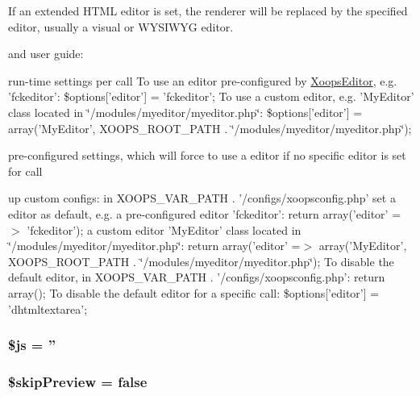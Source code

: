 If an extended H\-T\-M\-L editor is set, the renderer will be replaced by the specified editor, usually a visual or W\-Y\-S\-I\-W\-Y\-G editor.


\begin{DoxyItemize}
\item 
\end{DoxyItemize}and user guide\-:  
\begin{DoxyItemize}
\item 
\end{DoxyItemize}run-\/time settings per call To use an editor pre-\/configured by \hyperlink{}{Xoops\-Editor}, e.\-g. 'fckeditor'\-: {\ttfamily \$options\mbox{[}'editor'\mbox{]} = 'fckeditor';} To use a custom editor, e.\-g. 'My\-Editor' class located in \char`\"{}/modules/myeditor/myeditor.\-php\char`\"{}\-: {\ttfamily \$options\mbox{[}'editor'\mbox{]} = array('My\-Editor', X\-O\-O\-P\-S\-\_\-\-R\-O\-O\-T\-\_\-\-P\-A\-T\-H . \char`\"{}/modules/myeditor/myeditor.\-php\char`\"{});}    
\begin{DoxyItemize}
\item 
\end{DoxyItemize}pre-\/configured settings, which will force to use a editor if no specific editor is set for call  
\begin{DoxyItemize}
\item 
\end{DoxyItemize}up custom configs\-: in X\-O\-O\-P\-S\-\_\-\-V\-A\-R\-\_\-\-P\-A\-T\-H . '/configs/xoopsconfig.php' set a editor as default, e.\-g. a pre-\/configured editor 'fckeditor'\-: {\ttfamily return array('editor' =$>$ 'fckeditor');} a custom editor 'My\-Editor' class located in \char`\"{}/modules/myeditor/myeditor.\-php\char`\"{}\-: {\ttfamily return array('editor' =$>$ array('My\-Editor', X\-O\-O\-P\-S\-\_\-\-R\-O\-O\-T\-\_\-\-P\-A\-T\-H . \char`\"{}/modules/myeditor/myeditor.\-php\char`\"{});}   To disable the default editor, in X\-O\-O\-P\-S\-\_\-\-V\-A\-R\-\_\-\-P\-A\-T\-H . '/configs/xoopsconfig.php'\-: {\ttfamily return array();} To disable the default editor for a specific call\-: {\ttfamily \$options\mbox{[}'editor'\mbox{]} = 'dhtmltextarea';}    \hypertarget{class_xoops_form_dhtml_text_area_a747181e96d083c6396169e81e4d2056d}{
\subsubsection[{\$js}]{\setlength{\rightskip}{0pt plus 5cm}\$js = ''}}\label{class_xoops_form_dhtml_text_area_a747181e96d083c6396169e81e4d2056d}
\hypertarget{class_xoops_form_dhtml_text_area_aa0dd4edcea52081fc67fdc3053edc2ed}{
\subsubsection[{\$skip\-Preview}]{\setlength{\rightskip}{0pt plus 5cm}\$skip\-Preview = false}}\label{class_xoops_form_dhtml_text_area_aa0dd4edcea52081fc67fdc3053edc2ed}


